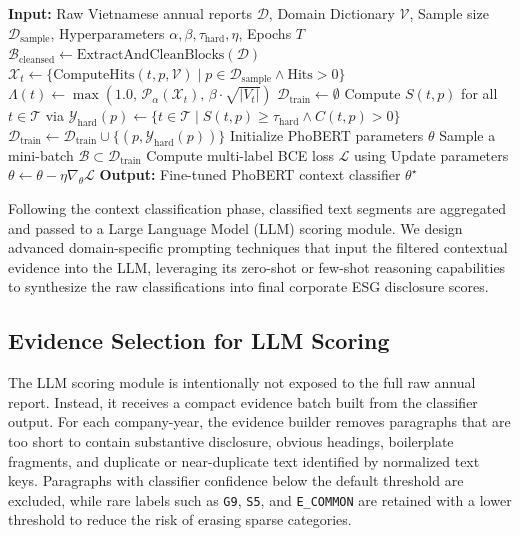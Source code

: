 \documentclass{article}
\theoremstyle{plain}
\theoremstyle{definition}
\theoremstyle{remark}
\begin{document}
\begin{algorithm}[h]
\caption{Training Procedure of the Proposed Framework}
\label{alg:training}
\begin{algorithmic}[1]
\STATE \textbf{Input:} Raw Vietnamese annual reports $\mathcal{D}$, Domain Dictionary $\mathcal{V}$, Sample size $\mathcal{D}_{\text{sample}}$, Hyperparameters $\alpha, \beta, \tau_{\text{hard}}, \eta$, Epochs $T$
\STATE $\mathcal{B}_{\text{cleansed}} \leftarrow \text{ExtractAndCleanBlocks}(\mathcal{D})$ 
    \STATE $\mathcal{X}_t \leftarrow \{ \text{ComputeHits}(t, p, \mathcal{V}) \mid p \in \mathcal{D}_{\text{sample}} \land \text{Hits} > 0 \}$
    \STATE $\Lambda(t) \leftarrow \max \left( 1.0, \, \mathcal{P}_{\alpha}(\mathcal{X}_t), \, \beta \cdot \sqrt{|V_t|} \right)$ 
\ENDFOR
\STATE $\mathcal{D}_{\text{train}} \leftarrow \emptyset$
    \STATE Compute $S(t, p)$ for all $t \in \mathcal{T}$ via 
    \STATE $\mathcal{Y}_{\text{hard}}(p) \leftarrow \{ t \in \mathcal{T} \mid S(t, p) \geq \tau_{\text{hard}} \land C(t, p) > 0 \}$
    \STATE $\mathcal{D}_{\text{train}} \leftarrow \mathcal{D}_{\text{train}} \cup \{(p, \mathcal{Y}_{\text{hard}}(p))\}$
\ENDFOR
\STATE Initialize PhoBERT parameters $\theta$
    \STATE Sample a mini-batch $\mathcal{B} \subset \mathcal{D}_{\text{train}}$
    \STATE Compute multi-label BCE loss $\mathcal{L}$ using 
    \STATE Update parameters $\theta \leftarrow \theta - \eta \nabla_{\theta}\mathcal{L}$
\ENDFOR
\STATE \textbf{Output:} Fine-tuned PhoBERT context classifier $\theta^{\star}$
\end{algorithmic}
\end{algorithm}

Following the context classification phase, classified text segments are aggregated and passed to a Large Language Model (LLM) scoring module. We design advanced domain-specific prompting techniques that input the filtered contextual evidence into the LLM, leveraging its zero-shot or few-shot reasoning capabilities to synthesize the raw classifications into final corporate ESG disclosure scores.

\subsection{Evidence Selection for LLM Scoring}
The LLM scoring module is intentionally not exposed to the full raw annual report. Instead, it receives a compact evidence batch built from the classifier output. For each company-year, the evidence builder removes paragraphs that are too short to contain substantive disclosure, obvious headings, boilerplate fragments, and duplicate or near-duplicate text identified by normalized text keys. Paragraphs with classifier confidence below the default threshold are excluded, while rare labels such as \texttt{G9}, \texttt{S5}, and \texttt{E\_COMMON} are retained with a lower threshold to reduce the risk of erasing sparse categories.
\end{document}

